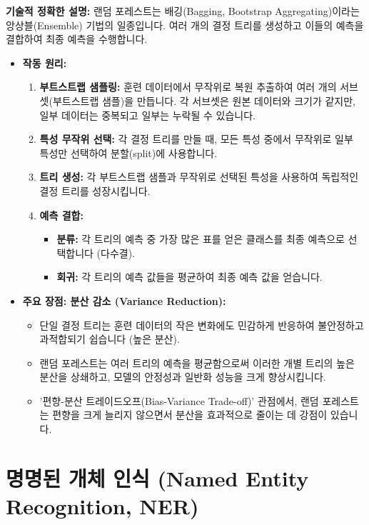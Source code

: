 \documentclass[11pt,a4paper]{article}
\begin{document}
\textbf{기술적 정확한 설명:}
랜덤 포레스트는 배깅(Bagging, Bootstrap Aggregating)이라는 앙상블(Ensemble) 기법의 일종입니다. 여러 개의 결정 트리를 생성하고 이들의 예측을 결합하여 최종 예측을 수행합니다.

\begin{itemize}
    \item \textbf{작동 원리:}
        \begin{enumerate}
            \item \textbf{부트스트랩 샘플링:} 훈련 데이터에서 무작위로 복원 추출하여 여러 개의 서브셋(부트스트랩 샘플)을 만듭니다. 각 서브셋은 원본 데이터와 크기가 같지만, 일부 데이터는 중복되고 일부는 누락될 수 있습니다.
            \item \textbf{특성 무작위 선택:} 각 결정 트리를 만들 때, 모든 특성 중에서 무작위로 일부 특성만 선택하여 분할(split)에 사용합니다.
            \item \textbf{트리 생성:} 각 부트스트랩 샘플과 무작위로 선택된 특성을 사용하여 독립적인 결정 트리를 성장시킵니다.
            \item \textbf{예측 결합:}
                \begin{itemize}
                    \item \textbf{분류:} 각 트리의 예측 중 가장 많은 표를 얻은 클래스를 최종 예측으로 선택합니다 (다수결).
                    \item \textbf{회귀:} 각 트리의 예측 값들을 평균하여 최종 예측 값을 얻습니다.
                \end{itemize}
        \end{enumerate}
    \item \textbf{주요 장점: 분산 감소 (Variance Reduction):}
        \begin{itemize}
            \item 단일 결정 트리는 훈련 데이터의 작은 변화에도 민감하게 반응하여 불안정하고 과적합되기 쉽습니다 (높은 분산).
            \item 랜덤 포레스트는 여러 트리의 예측을 평균함으로써 이러한 개별 트리의 높은 분산을 상쇄하고, 모델의 안정성과 일반화 성능을 크게 향상시킵니다.
            \item '편향-분산 트레이드오프(Bias-Variance Trade-off)' 관점에서, 랜덤 포레스트는 편향을 크게 늘리지 않으면서 분산을 효과적으로 줄이는 데 강점이 있습니다.
        \end{itemize}
\end{itemize}

\newpage
\section*{명명된 개체 인식 (Named Entity Recognition, NER)}
\end{document}
